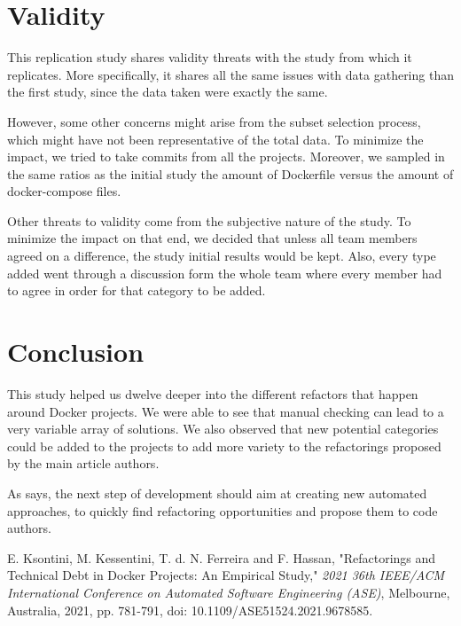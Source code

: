 \documentclass[lettersize,journal]{IEEEtran}
\begin{document}

\section{Validity}

This replication study shares validity threats with the study from \cite{1} which it replicates.
More specifically, it shares all the same issues with data gathering than the first study, since the data taken were exactly the same.

However, some other concerns might arise from the subset selection process, which might have not been representative of the total data.
To minimize the impact, we tried to take commits from all the projects.
Moreover, we sampled in the same ratios as the initial study the amount of Dockerfile versus the amount of docker-compose files.

Other threats to validity come from the subjective nature of the study.
To minimize the impact on that end, we decided that unless all team members agreed on a difference, the study initial results would be kept.
Also, every type added went through a discussion form the whole team where every member had to agree in order for that category to be added.

\section{Conclusion}

This study helped us dwelve deeper into the different refactors that happen around Docker projects.
We were able to see that manual checking can lead to a very variable array of solutions.
We also observed that new potential categories could be added to the projects to add more variety to the refactorings proposed by the main article authors.

As \cite{1} says, the next step of development should aim at creating new automated approaches, to quickly find refactoring opportunities and propose them to code authors.

\begin{thebibliography}{1}


E. Ksontini, M. Kessentini, T. d. N. Ferreira and F. Hassan, "Refactorings and Technical Debt in Docker Projects: An Empirical Study," \textit{2021 36th IEEE/ACM International Conference on Automated Software Engineering (ASE)}, Melbourne, Australia, 2021, pp. 781-791, doi: 10.1109/ASE51524.2021.9678585.

\end{thebibliography}

\vfill
\end{document}
